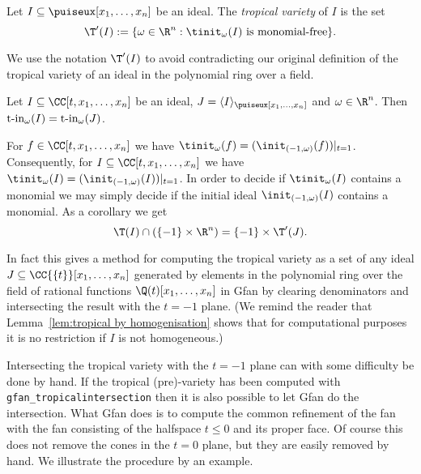 \begin{definition}
\label{def:tropvar}
Let $I\subseteq \puiseux[x_1,\dots,x_n]$ be an ideal. The \emph{tropical variety} of $I$ is the set
$$\T'(I):=\{\omega\in\R^n:\tinit_\omega(I) \textup{ is monomial-free}\}.$$
\end{definition}
We use the notation $\T'(I)$ to avoid contradicting our original definition
of the tropical variety of an ideal in the polynomial ring over a
field.


\begin{proposition} \cite[Proposition~7.3]{lifting}
\label{prop:computing tinit}
Let $I\subseteq \CC[t,x_1,\dots,x_n]$ be an ideal, $J=\langle I\rangle_{\puiseux[x_1,\dots,x_n]}$ and $\omega\in\R^n$. Then $\textup{t-in}_\omega(I)=\textup{t-in}_\omega(J)$.
\end{proposition}

\begin{remark}
\label{rem:computing tinit}
For $f\in\CC[t,x_1,\dots,x_n]$ we have
$\tinit_\omega(f)=(\init_{(-1,\omega)}(f))|_{t=1}$. Consequently, for
$I\subseteq\CC[t,x_1,\dots,x_n]$ we have
$\tinit_\omega(I)=(\init_{(-1,\omega)}(I))|_{t=1}$. In order to
decide if $\tinit_\omega(I)$ contains a monomial we may simply decide if the initial ideal
$\init_{(-1,\omega)}(I)$ contains a monomial.
 As a corollary we get
$$\T(I)\cap(\{-1\}\times\R^n)=\{-1\}\times\T'(J).$$

In fact this gives a method for computing the tropical variety as a set of any
ideal $J\subseteq\CC\{\{t\}\}[x_1,\dots,x_n]$ generated by elements
in the polynomial ring over the field of rational functions
$\Q(t)[x_1,\dots,x_n]$ in Gfan by clearing denominators and
intersecting the result with the $t=-1$ plane.  (We remind the reader
that Lemma~\ref{lem:tropical by homogenisation} shows that for
computational purposes it is no restriction if $I$ is not
homogeneous.)
\end{remark}

Intersecting the tropical variety with the $t=-1$ plane can with some difficulty be done by
hand. If the tropical (pre)-variety has been computed with
\texttt{gfan\_tropicalintersection} then it is also possible to let Gfan do
the intersection. What Gfan does is to compute the common refinement
of the fan with the fan consisting of the halfspace $t\leq 0$ and its
proper face. Of course this does not remove the cones in the $t=0$
plane, but they are easily removed by hand. We illustrate the
procedure by an example.

